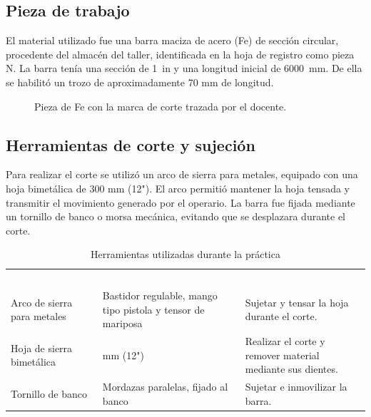 \documentclass[12pt,a4paper]{article}
\newcommand{\encab}[1]{\textcolor{white}{\sffamily\bfseries #1}}
\begin{document}
\subsection{Pieza de trabajo}

El material utilizado fue una barra maciza de acero (Fe) de sección circular,
procedente del almacén del taller, identificada en la hoja de registro como
pieza N. La barra tenía una sección de \SI{1}{in} y
una longitud inicial de \SI{6000}{\milli\metre}. De ella se habilitó un trozo de
aproximadamente 70 mm de longitud.

\begin{figure}[H]
	\centering
	\caption{Pieza de Fe con la marca de corte trazada por el docente.}
\end{figure}

\subsection{Herramientas de corte y sujeción}

Para realizar el corte se utilizó un arco de sierra para metales, equipado con
una hoja bimetálica de 300 mm (12"). El arco permitió mantener la hoja tensada y
transmitir el movimiento generado por el operario. La barra fue fijada mediante
un tornillo de banco o morsa mecánica, evitando que se desplazara durante el
corte.

\begin{table}[!htb]
	\centering
	\caption{Herramientas utilizadas durante la práctica}
	\small
	\begin{tabularx}{\linewidth}{
			>{\raggedright\arraybackslash}l
			>{\raggedright\arraybackslash}X
			>{\raggedright\arraybackslash}X
		}
		\rowcolor{darkblue}
		\encab{Herramienta}                                         &
		\encab{Especificación}                                      &
		\encab{Función}
		\\
		Arco de sierra para metales                                 &
		Bastidor regulable, mango tipo pistola y tensor de mariposa &
		Sujetar y tensar la hoja durante el corte.
		\\
		Hoja de sierra bimetálica                                   &
		300 mm (12")                                                &
		Realizar el corte y remover material mediante sus dientes.
		\\
		Tornillo de banco                                           &
		Mordazas paralelas, fijado al banco                         &
		Sujetar e inmovilizar la barra.
		\\
	\end{tabularx}
\end{table}
\end{document}
